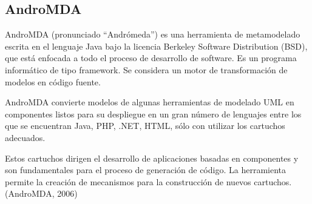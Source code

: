 \subsection{AndroMDA}
\begin{spacing}{2.0}
\end{spacing}

AndroMDA (pronunciado “Andrómeda”) es una herramienta de metamodelado escrita en el lenguaje Java bajo la licencia Berkeley Software Distribution (BSD), que está enfocada a todo el proceso de desarrollo de software. Es un programa informático de tipo framework. Se considera un motor de transformación de modelos en código fuente.

AndroMDA convierte modelos de algunas herramientas de modelado UML en componentes listos para su despliegue en un gran número de lenguajes entre los que se encuentran Java, PHP, .NET, HTML, sólo con utilizar los cartuchos adecuados.

Estos cartuchos dirigen el desarrollo de aplicaciones basadas en componentes y son fundamentales para el proceso de generación de código. La herramienta permite la creación de mecanismos para la construcción de nuevos cartuchos. (AndroMDA, 2006)

\begin{spacing}{2.0}
\end{spacing}

\
